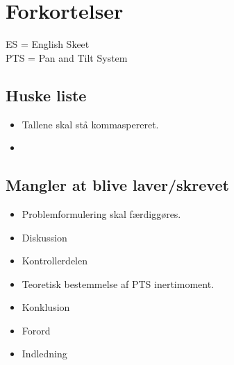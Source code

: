 \section*{Forkortelser}

ES = English Skeet \\
PTS = Pan and Tilt System

\subsection*{Huske liste}
\begin{itemize}
\item Tallene skal stå kommaspereret.
\item {}
\end{itemize}


\subsection*{Mangler at blive laver/skrevet}
\begin{itemize}
\item Problemformulering skal færdiggøres. 
\item Diskussion
\item Kontrollerdelen
\item Teoretisk bestemmelse af PTS inertimoment. 
\item Konklusion
\item Forord
\item Indledning

\end{itemize}